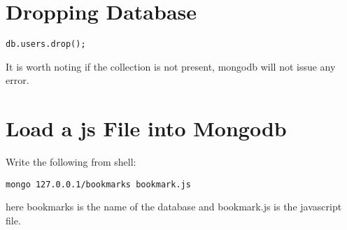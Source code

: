 \documentclass[a4paper, 12pt]{article}
\begin{document}
\section{Dropping Database}
\begin{verbatim}
db.users.drop();
\end{verbatim}
It is worth noting if the collection is not present, mongodb will not issue any error.

\section{Load a js File into Mongodb}
Write the following from shell:
\begin{verbatim}
mongo 127.0.0.1/bookmarks bookmark.js
\end{verbatim}
here bookmarks is the name of the database and bookmark.js is the javascript file.
\end{document}
